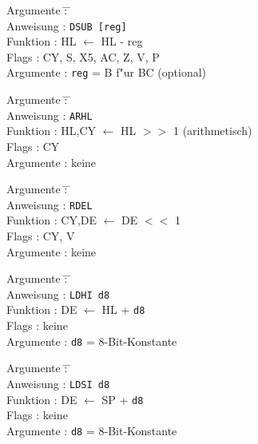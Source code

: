 \documentclass[12pt,a4paper,twoside]{report}
\newcommand{\tty}[1]{{\tt #1}}
\begin{document}
\begin{tabbing}
Argumente         \= : \= \kill \\
Anweisung         \> : \> \tty{DSUB [reg]} \\
Funktion          \> : \> HL $\leftarrow$ HL - reg \\
Flags             \> : \> CY, S, X5, AC, Z, V, P \\
Argumente         \> : \> \tty{reg} = B f"ur BC (optional) \\
\end{tabbing}

\begin{tabbing}
Argumente         \= : \= \kill \\
Anweisung         \> : \> \tty{ARHL} \\
Funktion          \> : \> HL,CY $\leftarrow$ HL $>>$ 1 (arithmetisch) \\
Flags             \> : \> CY \\
Argumente         \> : \> keine \\
\end{tabbing}

\begin{tabbing}
Argumente         \= : \= \kill \\
Anweisung         \> : \> \tty{RDEL} \\
Funktion          \> : \> CY,DE $\leftarrow$ DE $<<$ 1 \\
Flags             \> : \> CY, V \\
Argumente         \> : \> keine \\
\end{tabbing}

\begin{tabbing}
Argumente         \= : \= \kill \\
Anweisung         \> : \> \tty{LDHI d8} \\
Funktion          \> : \> DE $\leftarrow$ HL + {\tt d8} \\
Flags             \> : \> keine \\
Argumente         \> : \> {\tt d8} = 8-Bit-Konstante \\
\end{tabbing}

\begin{tabbing}
Argumente         \= : \= \kill \\
Anweisung         \> : \> \tty{LDSI d8} \\
Funktion          \> : \> DE $\leftarrow$ SP + {\tt d8} \\
Flags             \> : \> keine \\
Argumente         \> : \> {\tt d8} = 8-Bit-Konstante \\
\end{tabbing}
\end{document}
